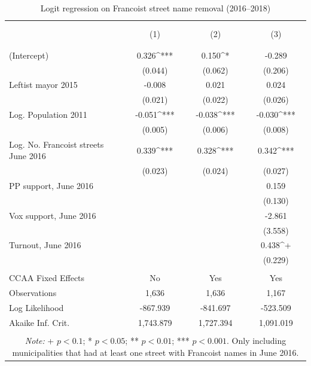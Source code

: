 \documentclass[12pt, titlepage]{article}
\begin{document}
\begin{table}[!htbp] \centering
  \caption{Logit regression on Francoist street name removal (2016--2018)}
  \label{tab:logit_fs_rm}
\small
\begin{tabular}{lccc}
\\[-1.8ex]\hline
\hline \\[-1.8ex]
\\[-1.8ex] & \multicolumn{1}{c}{(1)} & \multicolumn{1}{c}{(2)} & \multicolumn{1}{c}{(3)}\\
\\[-1.8ex]\hline
\\[-1.8ex]
 (Intercept) & 0.326^{***} & 0.150^{*} & -0.289 \\
  & (0.044) & (0.062) & (0.206) \\
  Leftist mayor 2015 & -0.008 & 0.021 & 0.024 \\
  & (0.021) & (0.022) & (0.026) \\
  Log. Population 2011 & -0.051^{***} & -0.038^{***} & -0.030^{***} \\
  & (0.005) & (0.006) & (0.008) \\
  Log. No. Francoist streets June 2016 & 0.339^{***} & 0.328^{***} & 0.342^{***} \\
  & (0.023) & (0.024) & (0.027) \\
  PP support, June 2016 &  &  & 0.159 \\
  &  &  & (0.130) \\
  Vox support, June 2016 &  &  & -2.861 \\
  &  &  & (3.558) \\
  Turnout, June 2016 &  &  & 0.438^{+} \\
  &  &  & (0.229) \\
 \hline \\[-1.8ex]
CCAA Fixed Effects & \multicolumn{1}{c}{No} & \multicolumn{1}{c}{Yes} & \multicolumn{1}{c}{Yes} \\
Observations & \multicolumn{1}{c}{1,636} & \multicolumn{1}{c}{1,636} & \multicolumn{1}{c}{1,167} \\
Log Likelihood & \multicolumn{1}{c}{-867.939} & \multicolumn{1}{c}{-841.697} & \multicolumn{1}{c}{-523.509} \\
Akaike Inf. Crit. & \multicolumn{1}{c}{1,743.879} & \multicolumn{1}{c}{1,727.394} & \multicolumn{1}{c}{1,091.019} \\
\hline
\hline \\[-1.8ex]
\multicolumn{4}{c}{\parbox[t]{0.75\textwidth}{\textit{Note:} + $p<0.1$; * $p<0.05$; ** $p<0.01$; *** $p<0.001$. Only including municipalities that had at least one street with Francoist names in June 2016.}} \\
\end{tabular}
\end{table}
\end{document}
